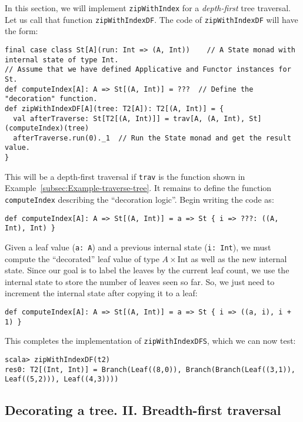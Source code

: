 In this section, we will implement \lstinline!zipWithIndex! for a
\emph{depth-first} tree traversal. Let us call that function \lstinline!zipWithIndexDF!.
The code of \lstinline!zipWithIndexDF! will have the form:
\begin{lstlisting}
final case class St[A](run: Int => (A, Int))    // A State monad with internal state of type Int.
// Assume that we have defined Applicative and Functor instances for St.
def computeIndex[A]: A => St[(A, Int)] = ???  // Define the "decoration" function.
def zipWithIndexDF[A](tree: T2[A]): T2[(A, Int)] = {
  val afterTraverse: St[T2[(A, Int)]] = trav[A, (A, Int), St](computeIndex)(tree)
  afterTraverse.run(0)._1  // Run the State monad and get the result value.
}
\end{lstlisting}
This will be a depth-first traversal if \lstinline!trav! is the function
shown in Example~\ref{subsec:Example-traverse-tree}. It remains
to define the function \lstinline!computeIndex! describing the \textsf{``}decoration
logic\textsf{''}. Begin writing the code as:
\begin{lstlisting}
def computeIndex[A]: A => St[(A, Int)] = a => St { i => ???: ((A, Int), Int) }
\end{lstlisting}
Given a leaf value (\lstinline!a: A!) and a previous internal state
(\lstinline!i: Int!), we must compute the \textsf{``}decorated\textsf{''} leaf value
of type $A\times\text{Int}$ as well as the new internal state. Since
our goal is to label the leaves by the current leaf count, we use
the internal state to store the number of leaves seen so far. So,
we just need to increment the internal state after copying it to a
leaf:
\begin{lstlisting}
def computeIndex[A]: A => St[(A, Int)] = a => St { i => ((a, i), i + 1) }
\end{lstlisting}
This completes the implementation of \lstinline!zipWithIndexDFS!,
which we can now test:
\begin{lstlisting}
scala> zipWithIndexDF(t2)
res0: T2[(Int, Int)] = Branch(Leaf((8,0)), Branch(Branch(Leaf((3,1)), Leaf((5,2))), Leaf((4,3))))
\end{lstlisting}


\subsection{Decorating a tree. II. Breadth-first traversal\label{subsec:Decorating-a-tree-breadth-first-traversal}}

